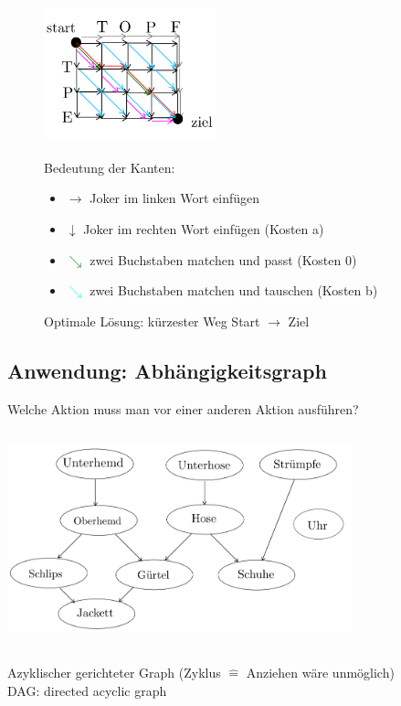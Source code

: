     \begin{figure}[htbp]
        \begin{minipage}{5cm}
            \vspace*{0mm}
            \includegraphics[width=5cm,height=4cm,keepaspectratio]{./Pictures/Dijkstragitter.png}
        \end{minipage}
        \begin{minipage}{10cm}
            \vspace*{0mm}
            Bedeutung der Kanten:
            \begin{itemize}
                \item $\rightarrow$ Joker im linken Wort einfügen
                \item $\downarrow$ Joker im rechten Wort einfügen (Kosten a)
                \item \textcolor{green}{$\searrow$} zwei Buchstaben matchen und passt (Kosten 0)
                \item \textcolor{cyan}{$\searrow$} zwei Buchstaben matchen und tauschen (Kosten b)
            \end{itemize}
            Optimale Lösung: kürzester Weg Start $\rightarrow$ Ziel
        \end{minipage}
    \end{figure}

    \subsection*{Anwendung: Abhängigkeitsgraph}

    Welche Aktion muss man vor einer anderen Aktion ausführen? \\

    \includegraphics[width=10cm,height=7cm,keepaspectratio]{./Pictures/Anziehen.png}\\
    Azyklischer gerichteter Graph (Zyklus $\widehat{=}$ Anziehen wäre unmöglich) \\
    DAG: directed acyclic graph\\

